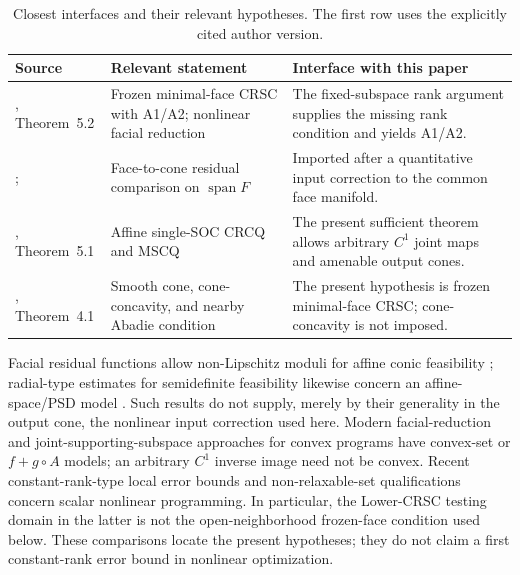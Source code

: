\documentclass[11pt]{article}
\numberwithin{equation}{section}
\theoremstyle{definition}
\theoremstyle{remark}
\DeclareMathOperator{\spann}{span}
\begin{document}
\begin{table}[!htbp]
\centering\small
\caption{Closest interfaces and their relevant hypotheses. The first row
uses the explicitly cited author version.}
\label{tab:nearest}
\begin{tabular}{@{}>{\raggedright\arraybackslash}p{.24\linewidth}
                  >{\raggedright\arraybackslash}p{.34\linewidth}
                  >{\raggedright\arraybackslash}p{.36\linewidth}@{}}
\toprule
Source & Relevant statement & Interface with this paper\\
\midrule
\citet{ahmr2025author}, Theorem~5.2 & Frozen minimal-face CRSC with A1/A2;
nonlinear facial reduction & The fixed-subspace rank argument supplies
the missing rank condition and yields A1/A2.\\[4pt]
\citet{lourencoAmenable}; \citet{lrs2022} & Face-to-cone residual comparison
on $\spann F$ & Imported after a quantitative input correction to the
common face manifold.\\[4pt]
\citet{chieu2026soc}, Theorem~5.1 & Affine single-SOC CRCQ and MSCQ &
The present sufficient theorem allows arbitrary $C^1$ joint maps and
amenable output cones.\\[4pt]
\citet{huy2025cone}, Theorem~4.1 & Smooth cone, cone-concavity, and nearby
Abadie condition & The present hypothesis is frozen minimal-face CRSC;
cone-concavity is not imposed.\\
\bottomrule
\end{tabular}
\end{table}

Facial residual functions allow non-Lipschitz moduli for affine conic
feasibility \citep{lindstrom2023frf}; radial-type estimates for
semidefinite feasibility likewise concern an affine-space/PSD model
\citep{nishijima2026radial}. Such results do not supply, merely by their
generality in the output cone, the nonlinear input correction used here.
Modern facial-reduction and joint-supporting-subspace approaches for
convex programs \citep{lin2025facial,scott2025joint} have convex-set or
$f+g\circ A$ models; an arbitrary $C^1$ inverse image need not be convex.
Recent constant-rank-type local error bounds and non-relaxable-set
qualifications \citep{andreani2026new,andreani2026nonrelaxable} concern
scalar nonlinear programming. In particular, the Lower-CRSC testing
domain in the latter is not the open-neighborhood frozen-face condition
used below. These comparisons locate the present hypotheses; they do
not claim a first constant-rank error bound in nonlinear optimization.
\end{document}

